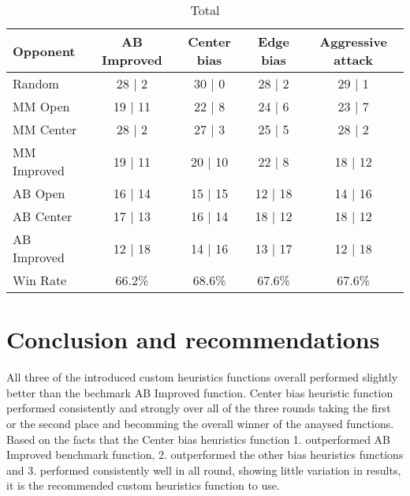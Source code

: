 \documentclass[11pt]{article}
\begin{document}
\begin{table}[H]
  \centering
  \caption{Total}
  \bigskip  
  \label{table:total}
  \begin{tabular}{l|c|c|c|c}
    Opponent & AB Improved & Center bias & Edge bias & Aggressive attack \\
    \hline
    Random & 28 | 2 & 30 | 0 & 28 | 2 & 29 | 1 \\
    MM Open & 19 | 11 & 22 | 8 & 24 | 6 & 23 | 7 \\
    MM Center & 28 | 2 & 27 | 3 & 25 | 5 & 28 | 2 \\
    MM Improved & 19 | 11 & 20 | 10 & 22 | 8 & 18 | 12 \\
    AB Open & 16 | 14 & 15 | 15 & 12 | 18 & 14 | 16 \\
    AB Center & 17 | 13 & 16 | 14 & 18 | 12 & 18 | 12 \\
    AB Improved & 12 | 18 & 14 | 16 & 13 | 17 & 12 | 18 \\
    \hline
    Win Rate & 66.2\% & 68.6\% & 67.6\% & 67.6\%
  \end{tabular}
\end{table}

\section{Conclusion and recommendations}

All three of the introduced custom heuristics functions overall performed slightly better than the bechmark AB Improved function. Center bias heuristic function performed consistently and strongly over all of the three rounds taking the first or the second place and becomming the overall winner of the anaysed functions. Based on the facts that the Center bias heuristics function 1. outperformed AB Improved benchmark function, 2. outperformed the other bias heuristics functions and 3. performed consistently well in all round, showing little variation in results, it is the recommended custom heuristics function to use.
\end{document}
